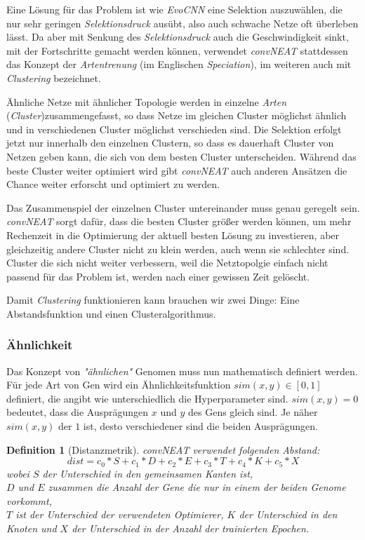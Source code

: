 \documentclass[]{scrartcl}
\newtheorem{defi}[satz]{Definition}
\begin{document}
			Eine Lösung für das Problem ist wie \textit{EvoCNN} eine Selektion auszuwählen, die nur sehr geringen
			\textit{Selektionsdruck} ausübt, also auch schwache Netze oft überleben lässt. Da aber mit Senkung des \textit{Selektionsdruck}
			auch die Geschwindigkeit sinkt, mit der Fortschritte gemacht werden können, verwendet \textit{convNEAT} stattdessen das Konzept
			der \textit{Artentrenung} (im Englischen \textit{Speciation}), im weiteren auch mit \textit{Clustering} bezeichnet.

			Ähnliche Netze mit ähnlicher Topologie werden in einzelne \textit{Arten} (\textit{Cluster})zusammengefasst, so dass Netze im gleichen
			Cluster möglichst ähnlich und in verschiedenen Cluster möglichst verschieden sind.
			Die Selektion erfolgt jetzt nur innerhalb den einzelnen Clustern, so dass es dauerhaft Cluster von Netzen geben kann, die sich von dem besten Cluster unterscheiden.
			Während das beste Cluster weiter optimiert wird gibt \textit{convNEAT} auch anderen Ansätzen die Chance weiter erforscht und optimiert zu werden.

			Das Zusammenspiel der einzelnen Cluster untereinander muss genau geregelt sein. \textit{convNEAT} sorgt dafür, dass
			die besten Cluster größer werden können, um mehr Rechenzeit in die Optimierung der aktuell besten Lösung zu investieren, aber gleichzeitig andere
			Cluster nicht zu klein werden, auch wenn sie schlechter sind. Cluster die sich nicht weiter verbessern, weil die Netztopolgie einfach
			nicht passend für das Problem ist, werden nach einer gewissen Zeit gelöscht.

			Damit \textit{Clustering} funktionieren kann brauchen wir zwei Dinge: Eine Abstandsfunktion und einen Clusteralgorithmus.

			\subsubsection{Ähnlichkeit}

				Das Konzept von \textit{"ähnlichen"} Genomen muss nun mathematisch definiert werden.
				Für jede Art von Gen wird ein Ähnlichkeitsfunktion $sim(x, y) \in [0, 1]$ definiert, die angibt wie unterschiedlich
				die Hyperparameter sind. $sim(x,y) = 0$ bedeutet, dass die Ausprägungen $x$ und $y$ des Gens gleich sind. Je näher $sim(x,y)$ der $1$ ist, desto verschiedener sind die beiden Ausprägungen.

				\begin{defi} [Distanzmetrik]
					\textit{convNEAT} verwendet folgenden Abstand: \\
					$$dist = c_0*S + c_1*D + c_2*E + c_3*T + c_4*K + c_5*X$$
					wobei $S$ der Unterschied in den gemeinsamen Kanten ist, \\
					$D$ und $E$ zusammen die Anzahl der Gene die nur in einem der beiden Genome vorkommt, \\
					$T$ ist der Unterschied der verwendeten Optimierer, $K$ der Unterschied in den Knoten und $X$ der Unterschied in der Anzahl der trainierten Epochen.
				\end{defi}
				
\end{document}
